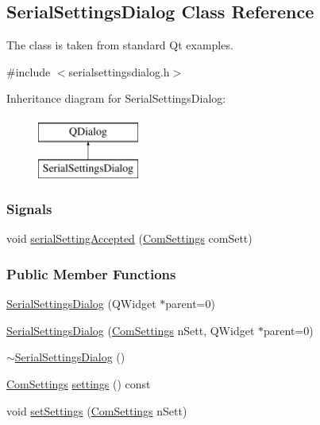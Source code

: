 \hypertarget{classSerialSettingsDialog}{}\subsection{Serial\+Settings\+Dialog Class Reference}
\label{classSerialSettingsDialog}

The class is taken from standard Qt examples. 

{\ttfamily \#include $<$serialsettingsdialog.\+h$>$}

Inheritance diagram for Serial\+Settings\+Dialog\+:\begin{figure}[H]
\begin{center}
\leavevmode
\includegraphics[height=2.000000cm]{classSerialSettingsDialog}
\end{center}
\end{figure}
\subsubsection*{Signals}
\begin{DoxyCompactItemize}
\item 
void \mbox{\hyperlink{classSerialSettingsDialog_a814c12a68be8eb01d2a5fe6fd9f6aaa7}{serial\+Setting\+Accepted}} (\mbox{\hyperlink{structComSettings}{Com\+Settings}} com\+Sett)
\end{DoxyCompactItemize}
\subsubsection*{Public Member Functions}
\begin{DoxyCompactItemize}
\item 
\mbox{\hyperlink{classSerialSettingsDialog_a5834dd80b40df594a5f93d664e1bba0a}{Serial\+Settings\+Dialog}} (Q\+Widget $\ast$parent=0)
\item 
\mbox{\hyperlink{classSerialSettingsDialog_ab8729269713f620c51862acc0f41f1fb}{Serial\+Settings\+Dialog}} (\mbox{\hyperlink{structComSettings}{Com\+Settings}} n\+Sett, Q\+Widget $\ast$parent=0)
\item 
\mbox{\hyperlink{classSerialSettingsDialog_a46a36a5ef33433be4a79c5d8b2b455ab}{$\sim$\+Serial\+Settings\+Dialog}} ()
\item 
\mbox{\hyperlink{structComSettings}{Com\+Settings}} \mbox{\hyperlink{classSerialSettingsDialog_a79327698eb7a95ab3b714cb4ccbc3599}{settings}} () const
\item 
void \mbox{\hyperlink{classSerialSettingsDialog_a0b31ad48fd2fe7fd9cce0c63eda3efb4}{set\+Settings}} (\mbox{\hyperlink{structComSettings}{Com\+Settings}} n\+Sett)
\end{DoxyCompactItemize}
